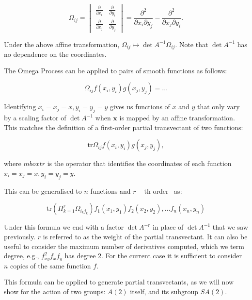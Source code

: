 \documentclass[review,onefignum,onetabnum]{siamonline190516}
\begin{document}
\begin{equation}
\Omega_{ij} = \begin{vmatrix} \frac{\partial}{\partial x_i} & \frac{\partial}{\partial y_i} \\ \frac{\partial}{\partial x_j} & \frac{\partial}{\partial y_j} \end{vmatrix}  = \frac{\partial^2}{\partial x_i \partial y_j} - \frac{\partial^2}{\partial x_j \partial y_i}.
\end{equation}

Under the above affine transformation, $\Omega_{ij} \mapsto \det A^{-1} \Omega_{ij}$. Note that $\det A^{-1}$ has no dependence on the coordinates. 

The Omega Process can be applied to pairs of smooth functions as follows:

\begin{equation}
\Omega_{ij} f(x_i, y_i) g(x_j, y_j) = ...
\end{equation}

Identifying $x_i = x_j = x, y_i = y_j = y$ gives us functions of $x$ and $y$ that only vary by a scaling factor of $\det A^{-1}$ when $\mathbf{x}$ is mapped by an affine transformation. This matches the definition of a first-order partial transvectant of two functions:

\begin{equation}
\mbox{tr} \Omega_{ij} f(x_i, y_i) g(x_j, y_j),
\end{equation}

\noindent where $mbox{tr}$  is the operator that identifies the coordinates of each function $x_i = x_j = x, y_i = y_j = y$.

This can be generalised to $n$ functions and $r-$th order~\cite{Olver} as:

\begin{equation}
\mbox{tr} \left( \Pi_{k=1}^r \Omega_{i_k j_k} \right) f_1(x_1, y_1) f_2(x_2, y_2), \ldots f_n (x_n, y_n)
\end{equation}

Under this formula we end with a factor $\det A^{-r}$ in place of $\det A^{-1}$ that we saw previously. $r$ is referred to as the weight of the partial transvectant. It can also be useful to consider the maximum number of derivatives computed, which we term degree, e.g., $f_{xy}^2 f_x f_y$ has degree 2.
For the current case it is sufficient to consider $n$ copies of the same function $f$.

This formula can be applied to generate partial transvectants, as we will now show for the action of two groups: $A(2)$ itself, and its subgroup $SA(2)$. 
\end{document}
